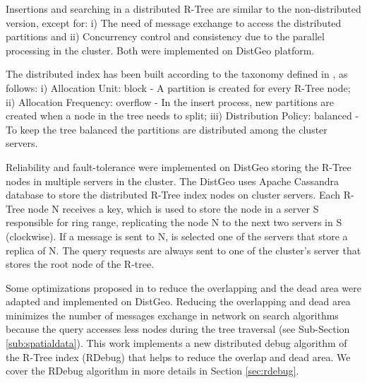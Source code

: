 Insertions and searching in a distributed R-Tree are similar to the non-distributed version, except for: i) The need of message exchange to access the distributed partitions and
ii) Concurrency control and consistency due to the parallel processing in the cluster. Both were implemented on DistGeo platform.

The distributed index has been built according to the taxonomy defined in \cite{an1999storing}, as follows: i) Allocation Unit: block - A partition is created for every R-Tree node; 
ii) Allocation Frequency: overflow - In the insert process, new partitions are created when a node in the tree needs to split; 
iii) Distribution Policy: balanced - To keep the tree balanced the partitions are distributed among the cluster servers.
	
Reliability and fault-tolerance were implemented on DistGeo storing the R-Tree nodes in multiple servers in the cluster. 
The DistGeo uses Apache Cassandra \cite{cassandra1apache} database to store the distributed R-Tree index nodes on cluster servers.
Each R-Tree node N receives a key, which is used to store the node in a server S responsible for ring range, replicating the node N to the next two servers in S (clockwise). 
If a message is sent to N, is selected one of the servers that store a replica of N.
The query requests are always sent to one of the cluster's server that stores the root node of the R-tree. 

Some optimizations proposed in \cite{beckmann1990r} to reduce the overlapping and the dead area were adapted and implemented on DistGeo. 
Reducing the overlapping and dead area minimizes the number of messages exchange in network on search algorithms because the query accesses less nodes during the tree traversal (see Sub-Section \ref{sub:spatialdata}). 
This work implements a new distributed debug algorithm of the R-Tree index (RDebug) that helps to reduce the overlap and dead area.
We cover the RDebug algorithm in more details in Section \ref{sec:rdebug}.